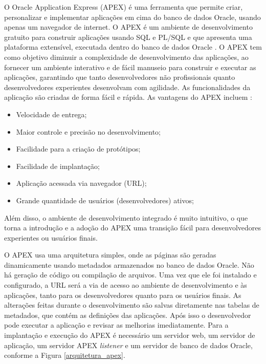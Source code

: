 O Oracle Application Express (APEX) é uma ferramenta que permite criar, personalizar e implementar aplicações em cima do banco de dados Oracle, usando apenas um navegador de internet. O APEX é um ambiente de desenvolvimento gratuito para construir aplicações usando SQL e PL/SQL e que apresenta uma plataforma extensível, executada dentro do banco de dados Oracle \cite{oracleApex}. O APEX tem como objetivo diminuir a complexidade de desenvolvimento das aplicações, ao fornecer um ambiente interativo e de fácil manuseio para construir e executar as aplicações, garantindo que tanto desenvolvedores não profissionais quanto desenvolvedores experientes desenvolvam com agilidade. As funcionalidades da aplicação são criadas de forma fácil e rápida. As vantagens do APEX incluem \cite{oracleApex}:
\begin{itemize}
	\item Velocidade de entrega;
	\item Maior controle e precisão no desenvolvimento;
	\item Facilidade para a criação de protótipos;
	\item Facilidade de implantação;
	\item Aplicação acessada via navegador (URL);
	\item Grande quantidade de usuários (desenvolvedores) ativos;
\end{itemize}

Além disso, o ambiente de desenvolvimento integrado é muito intuitivo, o que torna a introdução e a adoção do APEX uma transição fácil para desenvolvedores experientes ou usuários finais.

O APEX usa uma arquitetura simples, onde as páginas são geradas dinamicamente usando metadados armazenados no banco de dados Oracle. Não há geração de código ou compilação de arquivos. Uma vez que ele foi instalado e configurado, a URL será a via de acesso ao ambiente de desenvolvimento e às aplicações, tanto para os desenvolvedores quanto para os usuários finais. As alterações feitas durante o desenvolvimento são salvas diretamente nas tabelas de metadados, que contém as definições das aplicações. Após isso o desenvolvedor pode executar a aplicação e revisar as melhorias imediatamente.
Para a implantação e execução do APEX é necessário um servidor web, um servidor de aplicação, um servidor APEX \textit{listener} e um servidor de banco de dados Oracle, conforme a Figura \ref{arquitetura_apex}.
\clearpage

